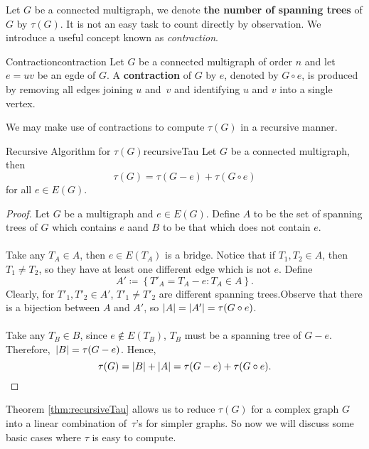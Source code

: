 \documentclass[math]{amznotes}
\theoremstyle{remark}
\begin{document}
Let $G$ be a connected multigraph, we denote \textbf{the number of spanning trees} of $G$ by $\tau(G)$. It is not an easy task to count directly by observation. We introduce a useful concept known as \textit{contraction}.
\begin{dfnbox}{Contraction}{contraction}
    Let $G$ be a connected multigraph of order $n$ and let $e = uv$ be an egde of $G$. A {\color{red} \textbf{contraction}} of $G$ by $e$, denoted by $G \circ e$, is produced by removing all edges joining $u$ and~$v$ and identifying $u$ and $v$ into a single vertex.
\end{dfnbox}
We may make use of contractions to compute $\tau(G)$ in a recursive manner.
\begin{thmbox}{Recursive Algorithm for $\tau(G)$}{recursiveTau}
    Let $G$ be a connected multigraph, then
    \begin{equation*}
        \tau(G) = \tau(G - e) + \tau(G \circ e)
    \end{equation*}
    for all $e \in E(G)$.
    \tcblower
    \begin{proof}
        Let $G$ be a multigraph and $e \in E(G)$. Define $A$ to be the set of spanning trees of $G$ which contains $e$ aand $B$ to be that which does not contain $e$.
        \\\\
        Take any $T_A \in A$, then $e \in E(T_A)$ is a bridge. Notice that if $T_1, T_2 \in A$, then~$T_1 \neq T_2$, so they have at least one different edge which is not $e$. Define
        \begin{equation*}
            A' \coloneqq \left\{T'_A = T_A - e \colon T_A \in A\right\}.
        \end{equation*}
        Clearly, for $T'_1, T'_2 \in A'$, $T'_1 \neq T'_2$ are different spanning trees.Observe that there is a bijection between $A$ and $A'$, so ${\left\lvert {A} \right\rvert} = {\left\lvert {A'} \right\rvert} = \tau(G \circ e)$.
        \\\\
        Take any $T_B \in B$, since $e \notin E(T_B)$, $T_B$ must be a spanning tree of $G - e$. Therefore,~${\left\lvert {B} \right\rvert} = \tau(G - e)$. Hence,
        \begin{equation*}
            \tau(G) = {\left\lvert {B} \right\rvert} + {\left\lvert {A} \right\rvert} = \tau(G - e) + \tau(G \circ e).
        \end{equation*}
    \end{proof}
\end{thmbox}
Theorem \ref{thm:recursiveTau} allows us to reduce $\tau(G)$ for a complex graph $G$ into a linear combination of~$\tau$'s for simpler graphs. So now we will discuss some basic cases where $\tau$ is easy to compute.
\end{document}
